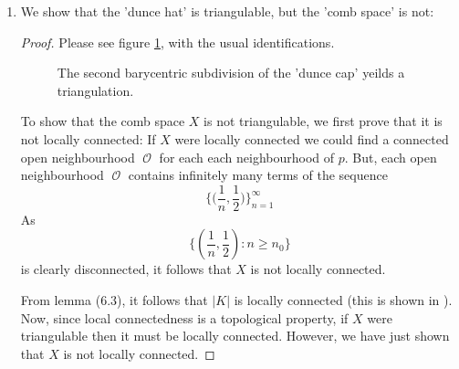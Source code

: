 \documentclass{book}
\DeclareMathOperator*{\Ocal}{\mathcal{O}}
\newenvironment{Lemma}[1][Lemma]
{\proof[#1]\leftskip=1cm\rightskip=1cm}
{\endproof} %
\begin{document}
\begin{enumerate}[(1)]
    \item We show that the 'dunce hat' is triangulable, but the 'comb space' is not: 
        \begin{proof} Please see figure \hyperref[fig:tikz:dunceHatTri]{\ref{fig:tikz:dunceHatTri}}, with the usual identifications. 
            \begin{figure}[p]
                \centering
                
                \caption{The second barycentric subdivision of the 'dunce cap' yeilds a triangulation.}
                \label{fig:tikz:dunceHatTri}
            \end{figure}
            \par To show that the comb space $X$ is not triangulable, we first prove that it is not locally connected: 
            \begin{Lemma}
                If $X$ were locally connected we could find a connected open neighbourhood $\Ocal$ for each each neighbourhood of $p$. But, each open neighbourhood $\Ocal$ contains infinitely many terms of the sequence 
                \[\Big\{\Big( \frac{1}{n}, \frac{1}{2} \Big)\Big\}_{n=1}^{\infty}\]
                As 
                \[ \Big\{(\frac{1}{n},\frac{1}{2}) : n \geq n_0  \Big\}\]
                is clearly disconnected, it follows that $X$ is not locally connected. 
            \end{Lemma}

            \par From lemma ($6.3$), it follows that $|K|$ is locally connected (this is shown in \cite{hatcher2002algebraic}). Now, since local connectedness is a topological property, if $X$ were triangulable then it must be locally connected. However, we have just shown that $X$ is not locally connected.  
        \end{proof}

\end{enumerate}
\end{document}
